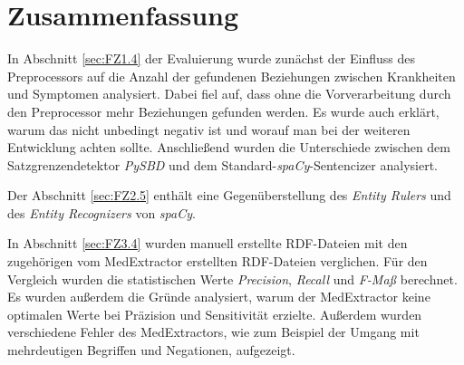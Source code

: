 




\section{Zusammenfassung}
\label{sec:zusammenfassung_evaluierung} 


In Abschnitt \ref{sec:FZ1.4} der Evaluierung wurde zunächst der Einfluss des Preprocessors auf die Anzahl der gefundenen Beziehungen zwischen Krankheiten und Symptomen analysiert. Dabei fiel auf, dass ohne die Vorverarbeitung durch den Preprocessor mehr Beziehungen gefunden werden. Es wurde auch erklärt, warum das nicht unbedingt negativ ist und worauf man bei der weiteren Entwicklung achten sollte. Anschließend wurden die Unterschiede zwischen dem Satzgrenzendetektor \emph{PySBD} und dem Standard-\emph{spaCy}-Sentencizer analysiert.

Der Abschnitt \ref{sec:FZ2.5} enthält eine Gegenüberstellung des \emph{Entity Rulers} und des \emph{Entity Recognizers} von \emph{spaCy}.

In Abschnitt \ref{sec:FZ3.4} wurden manuell erstellte RDF-Dateien mit den zugehörigen vom MedExtractor erstellten RDF-Dateien verglichen. Für den Vergleich wurden die statistischen Werte \emph{Precision}, \emph{Recall} und \emph{F-Maß} berechnet. Es wurden außerdem die Gründe analysiert, warum der MedExtractor keine optimalen Werte bei Präzision und Sensitivität erzielte. Außerdem wurden verschiedene Fehler des MedExtractors, wie zum Beispiel der Umgang mit mehrdeutigen Begriffen und Negationen, aufgezeigt.
